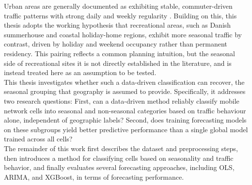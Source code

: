 Urban areas are generally documented as exhibiting stable, commuter-driven traffic patterns with strong daily and weekly regularity \cite{wang2015understanding}. Building on this, this thesis adopts the working hypothesis that recreational areas, such as Danish summerhouse and coastal holiday-home regions, exhibit more seasonal traffic by contrast, driven by holiday and weekend occupancy rather than permanent residency. This pairing reflects a common planning intuition, but the seasonal side of recreational sites it is not directly established in the literature, and is instead treated here as an assumption to be tested. \\

This thesis investigates whether such a data-driven classification can recover, the seasonal grouping that geography is assumed to provide. Specifically, it addresses two research questions: First, can a data-driven method reliably classify mobile network cells into seasonal and non-seasonal categories based on traffic behaviour alone, independent of geographic labels? Second, does training forecasting models on these subgroups yield better predictive performance than a single global model trained across all cells? \\


The remainder of this work first describes the dataset and preprocessing steps, then introduces a method for classifying cells based on seasonality and traffic behavior, and finally evaluates several forecasting approaches, including OLS, ARIMA, and XGBoost, in terms of forecasting performance. \\